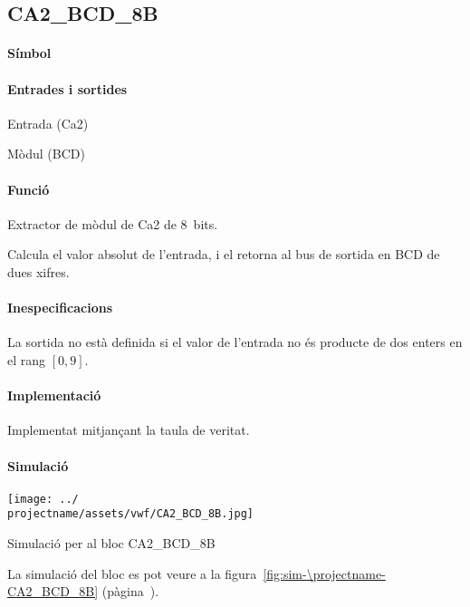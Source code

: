 \subsection{\label{sub:\projectname-CA2_BCD_8B} \textsf{CA2\_BCD\_8B}}

\paragraph{Símbol}

\begin{center}  \end{center}

\paragraph{Entrades i sortides}

\begin{where}
\item[\nodenamerange{CA2}{7}{0}] Entrada (Ca2)
\item[\nodenamerange{BCD}{7}{0}] Mòdul (BCD)
\end{where}

\paragraph{Funció}

Extractor de mòdul de Ca2 de 8~bits.

Calcula el valor absolut de l'entrada, i el retorna al bus de sortida en BCD de dues xifres.

\paragraph{Inespecificacions}


La sortida no està definida si el valor de l'entrada no és producte de dos
enters en el rang $\left[0, 9\right]$.


\paragraph{Implementació}




Implementat mitjançant la taula de veritat.

\paragraph{Simulació}

\begin{contendfig}
  \begin{center}
    \texttt{[image: ../\\projectname/assets/vwf/CA2\_BCD\_8B.jpg]}
  \end{center}
  \caption{\label{fig:sim-\projectname-CA2_BCD_8B} Simulació per al bloc \textsf{CA2\_BCD\_8B}}
\end{contendfig}

La simulació del bloc es pot veure a la figura~\ref{fig:sim-\projectname-CA2_BCD_8B} (pàgina~\pageref{fig:sim-\projectname-CA2_BCD_8B}).


\vspace{1cm}
